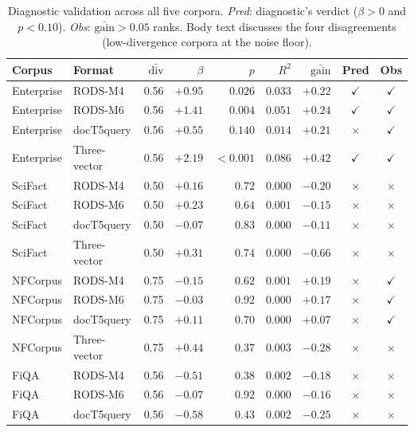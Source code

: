 \documentclass[11pt]{article}
\newcommand{\cmark}{\textcolor{bestcolor}{$\checkmark$}}
\newcommand{\xmark}{$\times$}
\begin{document}
\begin{table}[H]
\centering
\caption{Diagnostic validation across all five corpora. \emph{Pred}:
  diagnostic's verdict ($\beta>0$ and $p<0.10$).
  \emph{Obs}: $\bar{\mathrm{gain}}>0.05$ ranks. Body text discusses
  the four disagreements (low-divergence corpora at the noise floor).}
\label{tab:diag_loop}
\small
\begin{tabular}{llrrrrrcc}
\toprule
\textbf{Corpus} & \textbf{Format} & $\bar{\mathrm{div}}$ & $\beta$ & $p$ & $R^{2}$ & $\bar{\mathrm{gain}}$ & \textbf{Pred} & \textbf{Obs} \\
\midrule
Enterprise & RODS-M4         & 0.56 & $+0.95$ & $0.026$ & $0.033$ & $+0.22$ & \cmark & \cmark \\
Enterprise & RODS-M6         & 0.56 & $+1.41$ & $0.004$ & $0.051$ & $+0.24$ & \cmark & \cmark \\
Enterprise & docT5query      & 0.56 & $+0.55$ & $0.140$ & $0.014$ & $+0.21$ & \xmark & \cmark \\
Enterprise & Three-vector    & 0.56 & $+2.19$ & $<0.001$ & $0.086$ & $+0.42$ & \cmark & \cmark \\
\midrule
SciFact    & RODS-M4         & 0.50 & $+0.16$ & $0.72$  & $0.000$ & $-0.20$ & \xmark & \xmark \\
SciFact    & RODS-M6         & 0.50 & $+0.23$ & $0.64$  & $0.001$ & $-0.15$ & \xmark & \xmark \\
SciFact    & docT5query      & 0.50 & $-0.07$ & $0.83$  & $0.000$ & $-0.11$ & \xmark & \xmark \\
SciFact    & Three-vector    & 0.50 & $+0.31$ & $0.74$  & $0.000$ & $-0.66$ & \xmark & \xmark \\
\midrule
NFCorpus   & RODS-M4         & 0.75 & $-0.15$ & $0.62$  & $0.001$ & $+0.19$ & \xmark & \cmark \\
NFCorpus   & RODS-M6         & 0.75 & $-0.03$ & $0.92$  & $0.000$ & $+0.17$ & \xmark & \cmark \\
NFCorpus   & docT5query      & 0.75 & $+0.11$ & $0.70$  & $0.000$ & $+0.07$ & \xmark & \cmark \\
NFCorpus   & Three-vector    & 0.75 & $+0.44$ & $0.37$  & $0.003$ & $-0.28$ & \xmark & \xmark \\
\midrule
FiQA       & RODS-M4         & 0.56 & $-0.51$ & $0.38$  & $0.002$ & $-0.18$ & \xmark & \xmark \\
FiQA       & RODS-M6         & 0.56 & $-0.07$ & $0.92$  & $0.000$ & $-0.16$ & \xmark & \xmark \\
FiQA       & docT5query      & 0.56 & $-0.58$ & $0.43$  & $0.002$ & $-0.25$ & \xmark & \xmark \\

\end{tabular}
\end{table}
\end{document}
